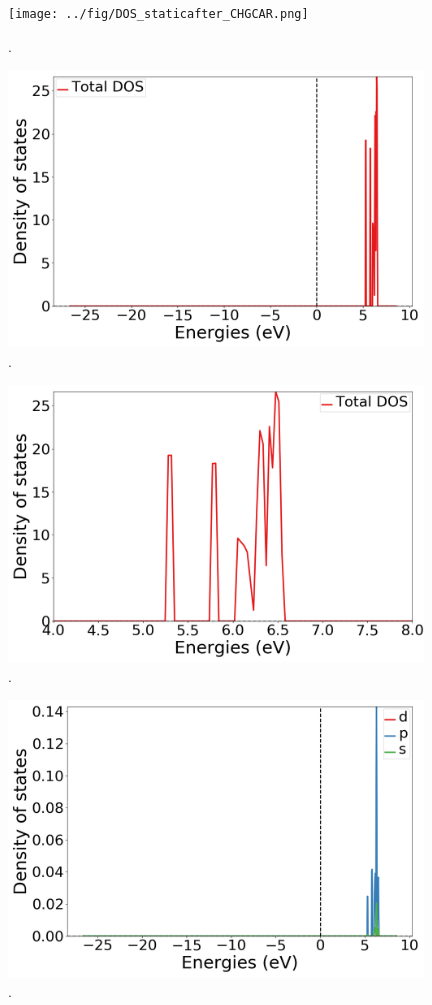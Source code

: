 \documentclass{article}
\begin{document}
  \begin{figure}[H]
      \centering
      \texttt{[image: ../fig/DOS\_staticafter\_CHGCAR.png]}
      \caption{. }
      \label{fig:DOS_staticafter_CHGCAR}
  \end{figure}
  \fi


  \begin{figure}[H]
      \centering
      \includegraphics[width = 11cm]{../fig/DOS_k4_TDOS_1.png}
      \caption{. }
      \label{fig:DOS_k4_TDOS_1}
  \end{figure}

  \begin{figure}[H]
      \centering
      \includegraphics[width = 11cm]{../fig/DOS_k4_TDOS_2.png}
      \caption{. }
      \label{fig:DOS_k4_TDOS_2}
  \end{figure}

  \begin{figure}[H]
      \centering
      \includegraphics[width = 11cm]{../fig/DOS_k4_LDOS25_1.png}
      \caption{.}
      \label{fig:DOS_k4_LDOS25_1}
  \end{figure}
\end{document}
